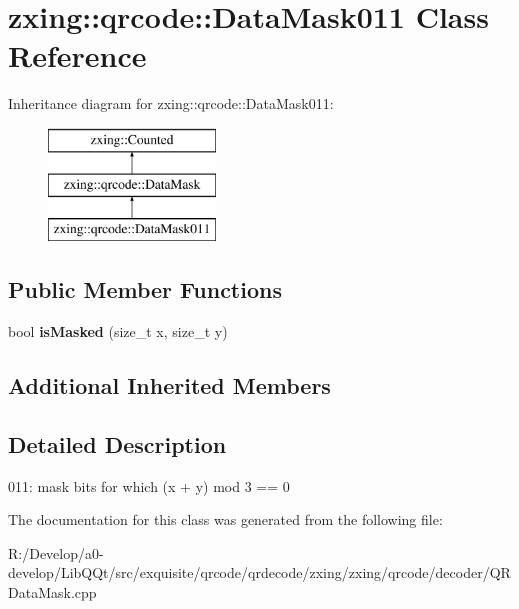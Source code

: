 \hypertarget{classzxing_1_1qrcode_1_1_data_mask011}{}\section{zxing\+:\+:qrcode\+:\+:Data\+Mask011 Class Reference}
\label{classzxing_1_1qrcode_1_1_data_mask011}
Inheritance diagram for zxing\+:\+:qrcode\+:\+:Data\+Mask011\+:\begin{figure}[H]
\begin{center}
\leavevmode
\includegraphics[height=3.000000cm]{classzxing_1_1qrcode_1_1_data_mask011}
\end{center}
\end{figure}
\subsection*{Public Member Functions}
\begin{DoxyCompactItemize}
\item 
\mbox{\label{classzxing_1_1qrcode_1_1_data_mask011_a14ddda0ad4ab8a95dbe73c5f2284515c}} 
bool {\bfseries is\+Masked} (size\+\_\+t x, size\+\_\+t y)
\end{DoxyCompactItemize}
\subsection*{Additional Inherited Members}


\subsection{Detailed Description}
011\+: mask bits for which (x + y) mod 3 == 0 

The documentation for this class was generated from the following file\+:\begin{DoxyCompactItemize}
\item 
R\+:/\+Develop/a0-\/develop/\+Lib\+Q\+Qt/src/exquisite/qrcode/qrdecode/zxing/zxing/qrcode/decoder/Q\+R\+Data\+Mask.\+cpp\end{DoxyCompactItemize}
